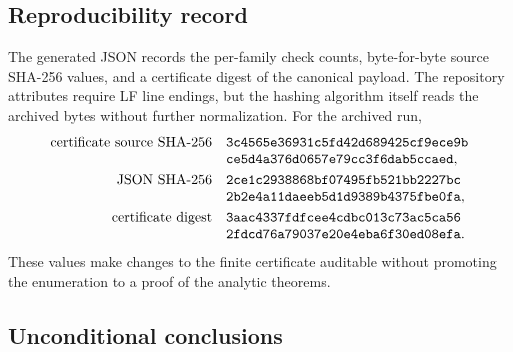 \subsection{Reproducibility record}

The generated JSON records the per-family check counts, byte-for-byte
source SHA-256 values, and a certificate digest of the canonical payload.
The repository attributes require LF line endings, but the hashing
algorithm itself reads the archived bytes without further normalization.
For the archived run,
\begin{align}
 \text{certificate source SHA-256}\quad
 &\texttt{3c4565e36931c5fd42d689425cf9ece9b}
 \notag\\[-0.3em]
 &\texttt{ce5d4a376d0657e79cc3f6dab5ccaed},
 \label{eq:tpc37-certificate-source-hash}\\
 \text{JSON SHA-256}\quad
 &\texttt{2ce1c2938868bf07495fb521bb2227bc}
 \notag\\[-0.3em]
 &\texttt{2b2e4a11daeeb5d1d9389b4375fbe0fa},
 \label{eq:tpc37-certificate-json-hash}\\
 \text{certificate digest}\quad
 &\texttt{3aac4337fdfcee4cdbc013c73ac5ca56}
 \notag\\[-0.3em]
 &\texttt{2fdcd76a79037e20e4eba6f30ed08efa}.
 \label{eq:tpc37-certificate-digest}
\end{align}
These values make changes to the finite certificate auditable without
promoting the enumeration to a proof of the analytic theorems.

\subsection{Unconditional conclusions}

